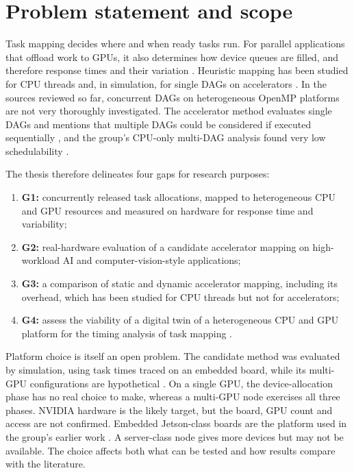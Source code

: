 \section{Problem statement and scope}
\label{sec:chap1_problem}

Task mapping decides where and when ready tasks run. For parallel applications that offload work to GPUs, it also determines how device queues are filled, and therefore response times and their variation \parencite{Samadi2026Accelerator}. Heuristic mapping has been studied for CPU threads \parencite{Samadi2024TaskToThread} and, in simulation, for single DAGs on accelerators \parencite{Samadi2026Accelerator}. In the sources reviewed so far, concurrent DAGs on heterogeneous OpenMP platforms are not very thoroughly investigated. The accelerator method evaluates single DAGs and mentions that multiple DAGs could be considered if executed sequentially \parencite{Samadi2026Accelerator}, and the group's CPU-only multi-DAG analysis found very low schedulability \parencite{Samadi2026Schedulability}.

The thesis therefore delineates four gaps for research purposes:
\begin{enumerate}
  \item \textbf{G1:} concurrently released task allocations, mapped to heterogeneous CPU and GPU resources and measured on hardware for response time and variability;
  \item \textbf{G2:} real-hardware evaluation of a candidate accelerator mapping on high-workload AI and computer-vision-style applications;
  \item \textbf{G3:} a comparison of static and dynamic accelerator mapping, including its overhead, which has been studied for CPU threads \parencite{Samadi2024StaticDynamic} but not for accelerators;
  \item \textbf{G4:} assess the viability of a digital twin of a heterogeneous CPU and GPU platform for the timing analysis of task mapping \parencite{Maiterth2025SRAPS,Kammeyer2025Thesis}.
\end{enumerate}

Platform choice is itself an open problem. The candidate method was evaluated by simulation, using task times traced on an embedded board, while its multi-GPU configurations are hypothetical \parencite{Samadi2026Accelerator}. On a single GPU, the device-allocation phase has no real choice to make, whereas a multi-GPU node exercises all three phases. NVIDIA hardware is the likely target, but the board, GPU count and access are not confirmed. Embedded Jetson-class boards are the platform used in the group's earlier work \parencite{Samadi2024StaticDynamic}. A server-class node gives more devices but may not be available. The choice affects both what can be tested and how results compare with the literature.

